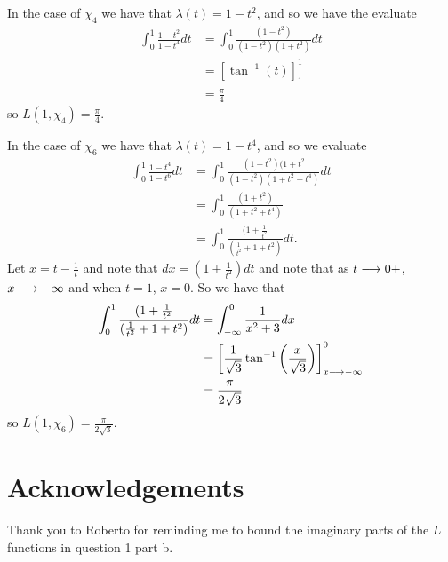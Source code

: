 \documentclass{unswmaths}
\begin{document}
In the case of $\chi_4 $ we have that 
$ \lambda(t) = 1 - t^2 $,
and so we have the evaluate
\begin{align*}
	\int_0^1 \frac{1-t^2}{1-t^4} dt &= \int_0^1 \frac{(1-t^2)}{(1-t^2)(1+t^2)}dt \\
		&= \left[ \tan^{-1}(t) \right]^1_1 \\
		&= \frac{\pi}{4}
\end{align*}
so $ L(1, \chi_4)  = \frac{\pi}{4} $.

In the case of $ \chi_6 $ we have that $ \lambda(t) = 1 - t^4 $, and so we evaluate
\begin{align*}
	\int_0^1 \frac{1-t^4}{1-t^6} dt &= \int_0^1 \frac{(1-t^2)(1+t^2}{(1-t^2)(1+t^2+t^4)}dt \\
		&= \int_0^1 \frac{(1+t^2)}{(1+t^2+t^4)} \\
		&= \int_0^1 \frac{(1+\frac{1}{t^2}}{(\frac{1}{t^2} + 1 + t^2)} dt.
\end{align*}
Let $ x = t - \frac{1}{t} $ and note that $ dx = (1 + \frac{1}{t^2})dt $
and note that as $ t \longrightarrow 0+ $, $ x \longrightarrow -\infty $ and when $ t = 1 $, $ x = 0 $.
So we have that 
\begin{align*}
	\int_0^1 \frac{(1+\frac{1}{t^2}}{(\frac{1}{t^2} + 1 + t^2)} dt &= \int_{-\infty}^0 \frac{1}{x^2 + 3} dx \\
		&= \left[ \frac{1}{\sqrt{3}}\tan^{-1}\left(\frac{x}{\sqrt{3}}\right)\right]_{x \longrightarrow -\infty}^0 \\
		&= \frac{\pi}{2\sqrt{3}}
\end{align*}
so $ L(1, \chi_6) = \frac{\pi}{2\sqrt{3}} $.

\section*{Acknowledgements}
Thank you to Roberto for reminding me to bound the imaginary parts of the $ L $ functions in question 1 part b.
\end{document}
